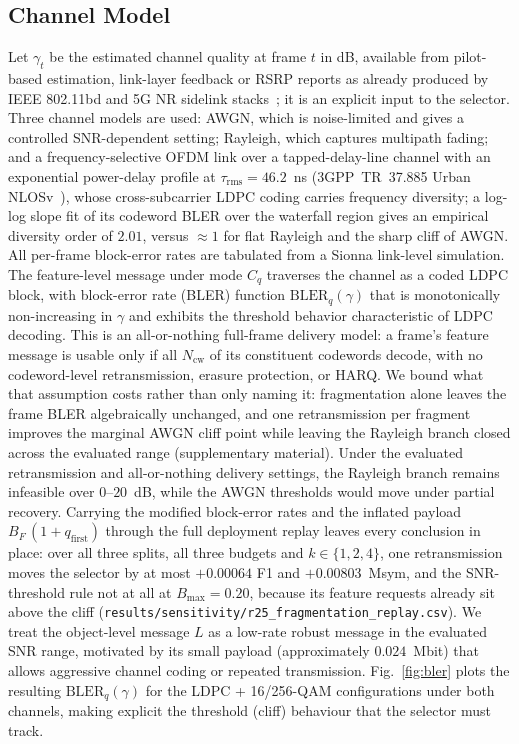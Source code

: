 \documentclass[journal]{IEEEtran}
\begin{document}
\subsection{Channel Model}\label{sec:channel}

Let $\gamma_t$ be the estimated channel quality at frame $t$ in dB, available from pilot-based estimation, link-layer feedback or RSRP reports as already produced by IEEE 802.11bd and 5G NR sidelink stacks~\cite{ieee80211bd}; it is an explicit input to the selector. Three channel models are used: AWGN, which is noise-limited and gives a controlled SNR-dependent setting; Rayleigh, which captures multipath fading; and a frequency-selective OFDM link over a tapped-delay-line channel with an exponential power-delay profile at $\tau_{\mathrm{rms}}=46.2$~ns (3GPP~TR~37.885 Urban NLOSv~\cite{3gpp37885}), whose cross-subcarrier LDPC coding carries frequency diversity; a log-log slope fit of its codeword BLER over the waterfall region gives an empirical diversity order of $2.01$, versus ${\approx}1$ for flat Rayleigh and the sharp cliff of AWGN. All per-frame block-error rates are tabulated from a Sionna link-level simulation. The feature-level message under mode $C_q$ traverses the channel as a coded LDPC block, with block-error rate (BLER) function $\mathrm{BLER}_q(\gamma)$ that is monotonically non-increasing in $\gamma$ and exhibits the threshold behavior characteristic of LDPC decoding. This is an all-or-nothing full-frame delivery model: a frame's feature message is usable only if all $N_{\mathrm{cw}}$ of its constituent codewords decode, with no codeword-level retransmission, erasure protection, or HARQ. We bound what that assumption costs rather than only naming it: fragmentation alone leaves the frame BLER algebraically unchanged, and one retransmission per fragment improves the marginal AWGN cliff point while leaving the Rayleigh branch closed across the evaluated range (supplementary material). Under the evaluated retransmission and all-or-nothing delivery settings, the Rayleigh branch remains infeasible over $0$--$20$~dB, while the AWGN thresholds would move under partial recovery. Carrying the modified block-error rates and the inflated payload $B_F\,(1+q_{\mathrm{first}})$ through the full deployment replay leaves every conclusion in place: over all three splits, all three budgets and $k\in\{1,2,4\}$, one retransmission moves the selector by at most $+0.00064$ F1 and $+0.00803$~Msym, and the SNR-threshold rule not at all at $B_{\max}=0.20$, because its feature requests already sit above the cliff (\texttt{results/sensitivity/r25\_fragmentation\_replay.csv}). We treat the object-level message $L$ as a low-rate robust message in the evaluated SNR range, motivated by its small payload (approximately $0.024$~Mbit) that allows aggressive channel coding or repeated transmission. Fig.~\ref{fig:bler} plots the resulting $\mathrm{BLER}_q(\gamma)$ for the LDPC + 16/256-QAM configurations under both channels, making explicit the threshold (cliff) behaviour that the selector must track.
\end{document}
